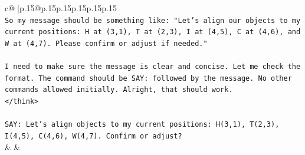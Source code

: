 \documentclass{article}
\begin{document}
{\begin{supertabular}{c@{$\;$}|p{.15\linewidth}@{}p{.15\linewidth}p{.15\linewidth}p{.15\linewidth}p{.15\linewidth}p{.15\linewidth}}
{{{\\ 
\texttt{So my message should be something like: "Let's align our objects to my current positions: H at (3,1), T at (2,3), I at (4,5), C at (4,6), and W at (4,7). Please confirm or adjust if needed."} \\
\\ 
\texttt{I need to make sure the message is clear and concise. Let me check the format. The command should be SAY: followed by the message. No other commands allowed initially. Alright, that should work.} \\
\texttt{</think>} \\
\\ 
\texttt{SAY: Let's align objects to my current positions: H(3,1), T(2,3), I(4,5), C(4,6), W(4,7). Confirm or adjust?} \\
            }
        }
    }
    & & \\ \\


\end{supertabular}}
\end{document}

